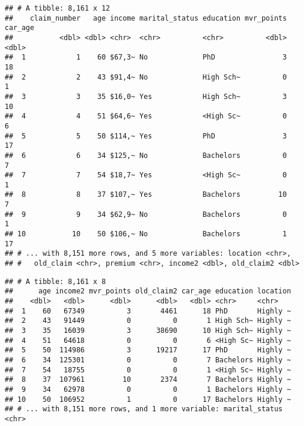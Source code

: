 \documentclass[]{article}
\newenvironment{Shaded}{\begin{snugshade}}{\end{snugshade}}
\newcommand{\KeywordTok}[1]{\textcolor[rgb]{0.13,0.29,0.53}{\textbf{#1}}}
\newcommand{\DecValTok}[1]{\textcolor[rgb]{0.00,0.00,0.81}{#1}}
\newcommand{\StringTok}[1]{\textcolor[rgb]{0.31,0.60,0.02}{#1}}
\newcommand{\OperatorTok}[1]{\textcolor[rgb]{0.81,0.36,0.00}{\textbf{#1}}}
\newcommand{\NormalTok}[1]{#1}
\begin{document}
\begin{verbatim}
## # A tibble: 8,161 x 12
##    claim_number   age income marital_status education mvr_points car_age
##           <dbl> <dbl> <chr>  <chr>          <chr>          <dbl>   <dbl>
##  1            1    60 $67,3~ No             PhD                3      18
##  2            2    43 $91,4~ No             High Sch~          0       1
##  3            3    35 $16,0~ Yes            High Sch~          3      10
##  4            4    51 $64,6~ Yes            <High Sc~          0       6
##  5            5    50 $114,~ Yes            PhD                3      17
##  6            6    34 $125,~ No             Bachelors          0       7
##  7            7    54 $18,7~ Yes            <High Sc~          0       1
##  8            8    37 $107,~ Yes            Bachelors         10       7
##  9            9    34 $62,9~ No             Bachelors          0       1
## 10           10    50 $106,~ No             Bachelors          1      17
## # ... with 8,151 more rows, and 5 more variables: location <chr>,
## #   old_claim <chr>, premium <chr>, income2 <dbl>, old_claim2 <dbl>
\end{verbatim}

\begin{Shaded}
\end{Shaded}

\begin{verbatim}
## # A tibble: 8,161 x 8
##      age income2 mvr_points old_claim2 car_age education location
##    <dbl>   <dbl>      <dbl>      <dbl>   <dbl> <chr>     <chr>   
##  1    60   67349          3       4461      18 PhD       Highly ~
##  2    43   91449          0          0       1 High Sch~ Highly ~
##  3    35   16039          3      38690      10 High Sch~ Highly ~
##  4    51   64618          0          0       6 <High Sc~ Highly ~
##  5    50  114986          3      19217      17 PhD       Highly ~
##  6    34  125301          0          0       7 Bachelors Highly ~
##  7    54   18755          0          0       1 <High Sc~ Highly ~
##  8    37  107961         10       2374       7 Bachelors Highly ~
##  9    34   62978          0          0       1 Bachelors Highly ~
## 10    50  106952          1          0      17 Bachelors Highly ~
## # ... with 8,151 more rows, and 1 more variable: marital_status <chr>
\end{verbatim}
\end{document}
